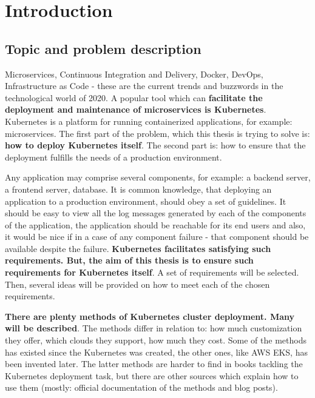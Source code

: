 \section{Introduction}


\subsection{Topic and problem description}

Microservices, Continuous Integration and Delivery, Docker, DevOps, Infrastructure as Code - these are the current trends and buzzwords in the technological world of 2020. A popular tool which can \textbf{facilitate the deployment and maintenance of microservices is Kubernetes}. Kubernetes is a platform for running containerized applications, for example: microservices. The first part of the problem, which this thesis is trying to solve is: \textbf{how to deploy Kubernetes itself}. The second part is: how to ensure that the deployment fulfills the needs of a production environment.

Any application may comprise several components, for example: a backend server, a frontend server, database. It is common knowledge, that deploying an application to a production environment, should obey a set of guidelines. It should be easy to view all the log messages generated by each of the components of the application, the application should be reachable for its end users and also, it would be nice if in a case of any component failure - that component should be available despite the failure. \textbf{Kubernetes facilitates satisfying such requirements. But, the aim of this thesis is to ensure such requirements for Kubernetes itself}. A set of requirements will be selected. Then, several ideas will be provided on how to meet each of the chosen requirements.

\textbf{There are plenty methods of Kubernetes cluster deployment. Many will be described}. The methods differ in relation to: how much customization they offer, which clouds they support, how much they cost. Some of the methods has existed since the Kubernetes was created, the other ones, like AWS EKS, has been invented later. The latter methods are harder to find in books tackling the Kubernetes deployment task, but there are other sources which explain how to use them (mostly: official documentation of the methods and blog posts).

